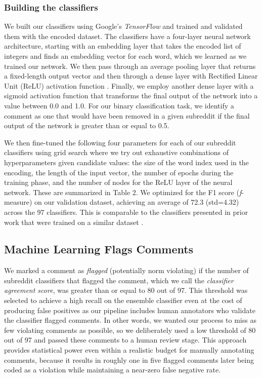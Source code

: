 \subsubsection{Building the classifiers} 
We built our classifiers using Google's \textit{TensorFlow} and trained and validated them with the encoded dataset. The classifiers have a four-layer neural network architecture, starting with an embedding layer that takes the encoded list of integers and finds an embedding vector for each word, which we learned as we trained our network. We then pass through an average pooling layer that returns a fixed-length output vector and then through a dense layer with Rectified Linear Unit (ReLU) activation function \cite{26_TensorFlow}. Finally, we employ another dense layer with a sigmoid activation function that transforms the final output of the network into a value between 0.0 and 1.0. For our binary classification task, we identify a comment as one that would have been removed in a given subreddit if the final output of the network is greater than or equal to 0.5. 

We then fine-tuned the following four parameters for each of our subreddit classifiers using grid search where we try out exhaustive combinations of hyperparameters given candidate values:  the size of the word index used in the encoding, the length of the input vector, the number of epochs during the training phase, and the number of nodes for the ReLU layer of the neural network. These are summarized in Table 2. We optimized for the F1 score (\textit{f}-measure) on our validation dataset, achieving an average of 72.3 (std=4.32) across the 97 classifiers. This is comparable to the classifiers presented in prior work that were trained on a similar dataset \cite{4_Chancellor, chandrasekharan2019crossmod}.





\subsection{Machine Learning Flags Comments}
We marked a comment as \textit{flagged} (potentially norm violating) if the number of subreddit classifiers that flagged the comment, which we call the \textit{classifier agreement score}, was greater than or equal to 80 out of 97. This threshold was selected to achieve a high recall on the ensemble classifier even at the cost of producing false positives as our pipeline includes human annotators who validate the classifier flagged comments. In other words, we wanted our process to miss as few violating comments as possible, so we deliberately used a low threshold of 80 out of 97 and passed these comments to a human review stage. This approach provides statistical power even within a realistic budget for manually annotating comments, because it results in roughly one in five flagged comments later being coded as a violation while maintaining a near-zero false negative rate.

